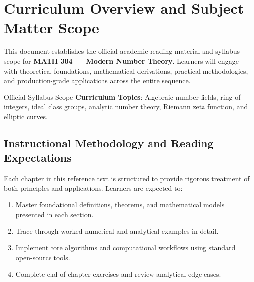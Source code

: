 \section{Curriculum Overview and Subject Matter Scope}

This document establishes the official academic reading material and syllabus scope for \textbf{MATH 304 --- Modern Number Theory}. Learners will engage with theoretical foundations, mathematical derivations, practical methodologies, and production-grade applications across the entire sequence.

\begin{InsightBox}{Official Syllabus Scope}
  \textbf{Curriculum Topics}: Algebraic number fields, ring of integers, ideal class groups, analytic number theory, Riemann zeta function, and elliptic curves.
\end{InsightBox}

\subsection{Instructional Methodology and Reading Expectations}

Each chapter in this reference text is structured to provide rigorous treatment of both principles and applications. Learners are expected to:
\begin{enumerate}
  \item Master foundational definitions, theorems, and mathematical models presented in each section.
  \item Trace through worked numerical and analytical examples in detail.
  \item Implement core algorithms and computational workflows using standard open-source tools.
  \item Complete end-of-chapter exercises and review analytical edge cases.
\end{enumerate}

